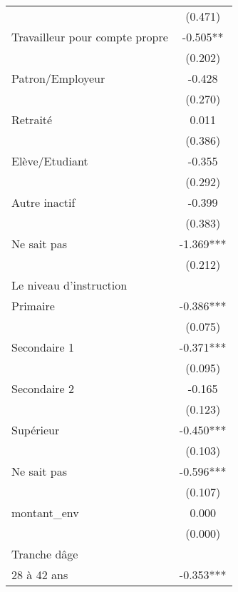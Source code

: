 \documentclass[a4paper,12pt]{article}
\begin{document}
\begin{table}[!htp]
\begin{minipage}{6cm}
{\begin{tabular}{lc}
		& (0.471)       \\
		Travailleur pour compte propre                                  & -0.505**      \\
		& (0.202)       \\
		Patron/Employeur                                                & -0.428        \\
		& (0.270)       \\
		Retraité                                                        & 0.011         \\
		& (0.386)       \\
		Elève/Etudiant                                                  & -0.355        \\
		& (0.292)       \\
		Autre inactif                                                   & -0.399        \\
		& (0.383)       \\
		Ne sait pas                                                     & -1.369***     \\
		& (0.212)       \\
		Le niveau d'instruction                                         &               \\
		Primaire                                                        & -0.386***     \\
		& (0.075)       \\
		Secondaire 1                                                    & -0.371***     \\
		& (0.095)       \\
		Secondaire 2                                                    & -0.165        \\
		& (0.123)       \\
		Supérieur                                                       & -0.450***     \\
		& (0.103)       \\
		Ne sait pas                                                     & -0.596***     \\
		& (0.107)       \\
		montant\_env                                                    & 0.000         \\
		& (0.000)       \\
		Tranche dâge                                                    &               \\
		28 à 42 ans                                                     & -0.353***     \\

\end{tabular}}
\end{minipage}
\end{table}
\end{document}
